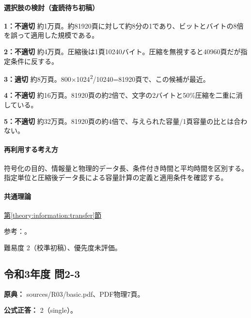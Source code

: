 \paragraph{選択肢の検討（査読待ち初稿）}\mbox{}\par

\noindent\textbf{1：不適切} 約1万頁。約81920頁に対して約8分の1であり、ビットとバイトの8倍を誤って適用した規模である。\par

\noindent\textbf{2：不適切} 約4万頁。圧縮後は1頁10240バイト。圧縮を無視すると40960頁だが指定条件に反する。\par

\noindent\textbf{3：適切} 約8万頁。800×1024\textsuperscript{2}/10240=\allowbreak{}81920頁で、この候補が最近。\par

\noindent\textbf{4：不適切} 約16万頁。81920頁の約2倍で、文字の2バイトと50\%圧縮を二重に消している。\par

\noindent\textbf{5：不適切} 約32万頁。81920頁の約4倍で、与えられた容量/1頁容量の比とは合わない。\par

\paragraph{再利用する考え方} 符号化の目的、情報量と物理的データ長、条件付き時間と平均時間を区別する。指定単位と圧縮後データ長による容量計算の定義と適用条件を確認する。

\paragraph{共通理論} \hyperref[theory:information:transfer]{第\ref*{theory:information:transfer}節}

\par 参考：\cite{info_deflate}。

\par 難易度 2（校準初稿）、優先度未評価。

\subsection{令和3年度 問2-3}
\label{q:r03-reg-basic-2-3}

\noindent\textbf{原典：} sources/R03/basic.pdf、PDF物理7頁。

\textbf{公式正答：} 2（single）。

